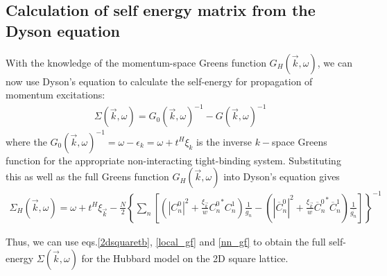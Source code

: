\documentclass{report}
\numberwithin{equation}{section}
\begin{document}
\subsection{Calculation of self energy matrix from the Dyson equation}
With the knowledge of the momentum-space Greens function $G_H(\vec k, \omega)$, we can now use Dyson's equation to calculate the self-energy for propagation of momentum excitations:
\begin{equation}\begin{aligned}
	\Sigma(\vec k,\omega) = G_0(\vec k,\omega)^{-1} - G(\vec k,\omega)^{-1}
\end{aligned}\end{equation}
where the $G_{0}(\vec k, \omega)^{-1}  = \omega -\epsilon_{k} = \omega +t^{H}\xi_{k}$ is the inverse $k-$space Greens function for the appropriate non-interacting tight-binding system. Substituting this as well as the full Greens function $G_H(\vec k, \omega)$ into Dyson's equation gives
\begin{equation}\begin{aligned}
	\Sigma_H(\vec k,\omega) = \omega +t^{H}\xi_{\vec k} - \frac{N}{2}\left\{\sum_n\left[\left(|C^0_{n}|^2 + \frac{\xi_{\vec{k}}}{w}{C^0_{n}}^* C^1_{n} \right)\frac{1}{g_n} - \left(|\overline C^0_{n}|^2 + \frac{\xi_{\vec{k}}}{w}{\overline C^0_{n}}^* \overline C^1_{n}\right)\frac{1}{\overline{g_n}}\right]\right\}^{-1}
\end{aligned}\end{equation}

Thus, we can use eqs.\eqref{2dsquaretb}, \eqref{local_gf} and \eqref{nn_gf} to obtain the full self-energy $\Sigma (\vec{k},\omega)$ for the Hubbard model on the 2D square lattice.
		
\end{document}
